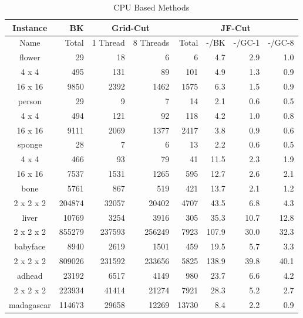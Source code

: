 \begin{table}
\caption{CPU Based Methods}
\label{table cpu performance}
{
    \fontsize{6.5pt}{7.5pt}\selectfont
    \begin{tabular}{@{ }c|r|r@{ }r|r@{ }r@{ }r@{ }r@{ }}
    \hline
    Instance & BK & \multicolumn{2}{c}{Grid-Cut} & \multicolumn{4}{c}{JF-Cut}\\
    \hline
    Name        & Total     & 1 Thread & 8 Threads & Total & -/BK  & -/GC-1 & -/GC-8\\
    \hline
    flower      & 29        & 18     & 6       & 6     & 4.7   & 2.9    & 1.0\\
    4 x 4       & 495       & 131    & 89      & 101   & 4.9   & 1.3    & 0.9\\
    16 x 16     & 9850      & 2392   & 1462    & 1575  & 6.3   & 1.5    & 0.9\\
    person      & 29        & 9      & 7       & 14    & 2.1   & 0.6    & 0.5\\
    4 x 4       & 494       & 121    & 92      & 118   & 4.2   & 1.0    & 0.8\\
    16 x 16     & 9111      & 2069   & 1377    & 2417  & 3.8   & 0.9    & 0.6\\
    sponge      & 28        & 7      & 6       & 13    & 2.2   & 0.6    & 0.5\\
    4 x 4       & 466       & 93     & 79      & 41    & 11.5  & 2.3    & 1.9\\
    16 x 16     & 7537      & 1531   & 1265    & 595   & 12.7  & 2.6    & 2.1\\
    \hline
    bone        & 5761      & 867    & 519     & 421   & 13.7  & 2.1    & 1.2\\
    2 x 2 x 2   & 204874    & 32057  & 20402   & 4707  & 43.5  & 6.8    & 4.3\\
    liver       & 10769     & 3254   & 3916    & 305   & 35.3  & 10.7   & 12.8\\
    2 x 2 x 2   & 855279    & 237593 & 256249  & 7923  & 107.9 & 30.0   & 32.3\\
    babyface    & 8940      & 2619   & 1501    & 459   & 19.5  & 5.7    & 3.3\\
    2 x 2 x 2   & 809026    & 231592 & 233656  & 5825  & 138.9 & 39.8   & 40.1\\
    adhead      & 23192     & 6517   & 4149    & 980   & 23.7  & 6.6    & 4.2\\
    2 x 2 x 2   & 223934    & 41414  & 21274   & 7921  & 28.3  & 5.2    & 2.7\\
    \hline
    madagascar  & 114673    & 29658  & 12269   & 13730 & 8.4   & 2.2    & 0.9\\

\end{tabular}}
\end{table}
